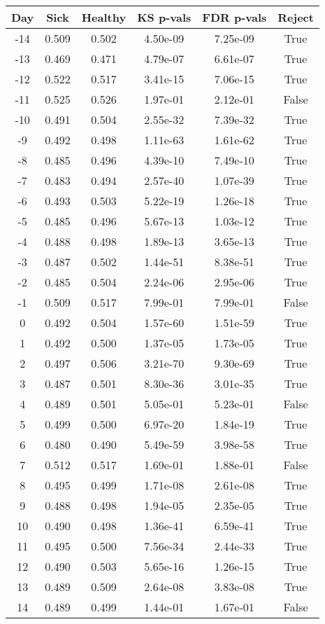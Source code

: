 \begin{tabular}{c|c|c|c|c|c}
Day &  Sick & Healthy &  KS p-vals & FDR p-vals & Reject\\
\hline
-14 & 0.509 &   0.502 &   4.50e-09 &   7.25e-09 &   True\\
-13 & 0.469 &   0.471 &   4.79e-07 &   6.61e-07 &   True\\
-12 & 0.522 &   0.517 &   3.41e-15 &   7.06e-15 &   True\\
-11 & 0.525 &   0.526 &   1.97e-01 &   2.12e-01 &  False\\
-10 & 0.491 &   0.504 &   2.55e-32 &   7.39e-32 &   True\\
 -9 & 0.492 &   0.498 &   1.11e-63 &   1.61e-62 &   True\\
 -8 & 0.485 &   0.496 &   4.39e-10 &   7.49e-10 &   True\\
 -7 & 0.483 &   0.494 &   2.57e-40 &   1.07e-39 &   True\\
 -6 & 0.493 &   0.503 &   5.22e-19 &   1.26e-18 &   True\\
 -5 & 0.485 &   0.496 &   5.67e-13 &   1.03e-12 &   True\\
 -4 & 0.488 &   0.498 &   1.89e-13 &   3.65e-13 &   True\\
 -3 & 0.487 &   0.502 &   1.44e-51 &   8.38e-51 &   True\\
 -2 & 0.485 &   0.504 &   2.24e-06 &   2.95e-06 &   True\\
 -1 & 0.509 &   0.517 &   7.99e-01 &   7.99e-01 &  False\\
  0 & 0.492 &   0.504 &   1.57e-60 &   1.51e-59 &   True\\
  1 & 0.492 &   0.500 &   1.37e-05 &   1.73e-05 &   True\\
  2 & 0.497 &   0.506 &   3.21e-70 &   9.30e-69 &   True\\
  3 & 0.487 &   0.501 &   8.30e-36 &   3.01e-35 &   True\\
  4 & 0.489 &   0.501 &   5.05e-01 &   5.23e-01 &  False\\
  5 & 0.499 &   0.500 &   6.97e-20 &   1.84e-19 &   True\\
  6 & 0.480 &   0.490 &   5.49e-59 &   3.98e-58 &   True\\
  7 & 0.512 &   0.517 &   1.69e-01 &   1.88e-01 &  False\\
  8 & 0.495 &   0.499 &   1.71e-08 &   2.61e-08 &   True\\
  9 & 0.488 &   0.498 &   1.94e-05 &   2.35e-05 &   True\\
 10 & 0.490 &   0.498 &   1.36e-41 &   6.59e-41 &   True\\
 11 & 0.495 &   0.500 &   7.56e-34 &   2.44e-33 &   True\\
 12 & 0.490 &   0.503 &   5.65e-16 &   1.26e-15 &   True\\
 13 & 0.489 &   0.509 &   2.64e-08 &   3.83e-08 &   True\\
 14 & 0.489 &   0.499 &   1.44e-01 &   1.67e-01 &  False\\
\end{tabular}